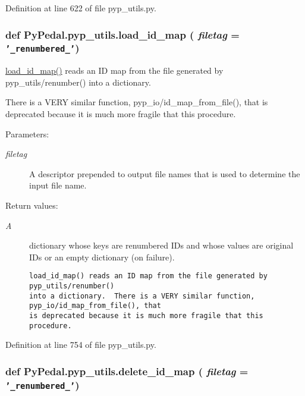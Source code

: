 Definition at line 622 of file pyp\_\-utils.py.\hypertarget{namespacePyPedal_1_1pyp__utils_0bbe2b7b7cc968f68a916aa003a4061c}{
\subsubsection[load\_\-id\_\-map]{\setlength{\rightskip}{0pt plus 5cm}def Py\-Pedal.pyp\_\-utils.load\_\-id\_\-map ( {\em filetag} = {\tt '\_\-renumbered\_\-'})}}
\label{namespacePyPedal_1_1pyp__utils_0bbe2b7b7cc968f68a916aa003a4061c}


\hyperlink{namespacePyPedal_1_1pyp__utils_0bbe2b7b7cc968f68a916aa003a4061c}{load\_\-id\_\-map()} reads an ID map from the file generated by pyp\_\-utils/renumber() into a dictionary. 

There is a VERY similar function, pyp\_\-io/id\_\-map\_\-from\_\-file(), that is deprecated because it is much more fragile that this procedure. \begin{Desc}
\item[Parameters:]
\begin{description}
\item[{\em filetag}]A descriptor prepended to output file names that is used to determine the input file name. \end{description}
\end{Desc}
\begin{Desc}
\item[Return values:]
\begin{description}
\item[{\em A}]dictionary whose keys are renumbered IDs and whose values are original IDs or an empty dictionary (on failure).

\footnotesize\begin{verbatim}load_id_map() reads an ID map from the file generated by pyp_utils/renumber()
into a dictionary.  There is a VERY similar function, pyp_io/id_map_from_file(), that
is deprecated because it is much more fragile that this procedure.
\end{verbatim}
\normalsize
 \end{description}
\end{Desc}


Definition at line 754 of file pyp\_\-utils.py.\hypertarget{namespacePyPedal_1_1pyp__utils_b39a83bc8fb8a42eacae9c1841784e64}{
\subsubsection[delete\_\-id\_\-map]{\setlength{\rightskip}{0pt plus 5cm}def Py\-Pedal.pyp\_\-utils.delete\_\-id\_\-map ( {\em filetag} = {\tt '\_\-renumbered\_\-'})}}
\label{namespacePyPedal_1_1pyp__utils_b39a83bc8fb8a42eacae9c1841784e64}



